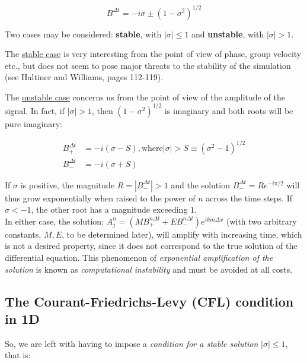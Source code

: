 	\begin{equation}
		B^{\Delta t} = -i \sigma \pm \left( 1 - \sigma^2 \right)^{1/2} 
		\label{adv-CTCS-1D-eigenvalues}
	\end{equation}
	

	Two cases may be considered: \textbf{stable}, with $|\sigma| \leq 1$ and \textbf{unstable}, with $|\sigma| > 1$.
	\medskip
	
	The \underline{stable case} is very interesting from the point of view of phase, group velocity etc., but does not seem to pose major threats to the stability of the simulation (see Haltiner and Williams, pages 112-119).
	
	\medskip
	The \underline{unstable case} concerns us from the point of view of the amplitude of the signal. In fact, if $|\sigma| > 1$, then $\left( 1 - \sigma^2 \right)^{1/2}$ is imaginary and both roots will be pure imaginary:
	
	\begin{align}
		B_{+}^{\Delta t}  &= -i \left ( \sigma -S \right)  \mathrm{,where } | \sigma| > S \equiv \left(  \sigma^2 - 1 \right)^{1/2} \nonumber \\
		B_{-}^{\Delta t}  &= -i \left ( \sigma +S \right)  \nonumber
		\label{adv-CTCS-1D-unstable-solution}
	\end{align}
	
	If $\sigma$ is positive, the magnitude $R=|B_{-}^{\Delta t}| > 1$ and the solution $ B_{-}^{\Delta t} = R e^{-i \pi /2 }$ will thus grow exponentially when raised to the power of $n$ across the time steps. If $\sigma < -1$, the other root has a magnitude exceeding $1$. \\
	In either case, the solution: $A_j^{n} = \left( M B_{+}^{n \Delta t}+ E B_{-}^{n \Delta t} \right)e^{i k m \Delta x}$  (with two arbitrary constants, $M,E$, to be determined later), will amplify with increasing time, which is not a desired property, since it does not correspond to the true solution of the differential equation. This phenomenon of \emph{exponential amplification of the solution} is known as \emph{computational instability} and must be avoided at all costs. 
	
\subsection{The Courant-Friedrichs-Levy (CFL) condition in 1D}

	So, we are left with having to impose a \emph{condition for a stable solution} $|\sigma| \leq 1$, that is:
	
